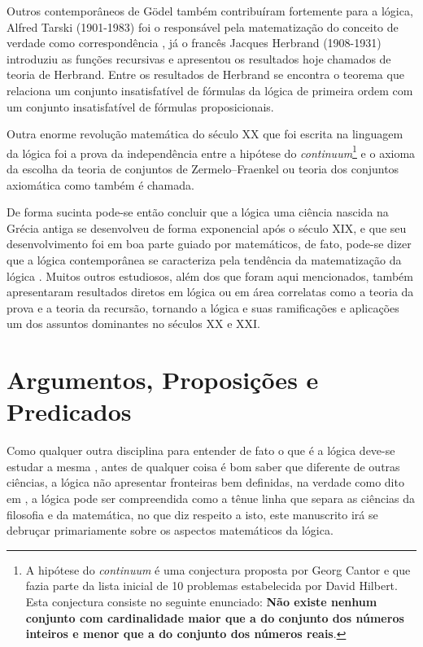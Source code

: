 Outros contemporâneos de Gödel também contribuíram fortemente para a lógica, Alfred Tarski (1901-1983) foi o responsável pela matematização do conceito de verdade como correspondência \cite{abe2002-logica, tarski1983}, já o francês Jacques Herbrand (1908-1931) introduziu as funções recursivas e apresentou os resultados hoje chamados de teoria de Herbrand. Entre os resultados de Herbrand se encontra o teorema que relaciona um conjunto insatisfatível de fórmulas da lógica de primeira ordem com um conjunto insatisfatível de fórmulas proposicionais.

Outra enorme revolução matemática do século XX que foi escrita na linguagem da lógica foi a prova da independência entre a hipótese do \textit{continuum}\footnote{A hipótese do \textit{continuum} é uma conjectura proposta por Georg Cantor e que fazia parte da lista inicial de 10 problemas estabelecida por David Hilbert. Esta conjectura consiste no seguinte enunciado: \textbf{Não existe nenhum conjunto com cardinalidade maior que a do conjunto dos números inteiros e menor que a do conjunto dos números reais}.} e o axioma da escolha da teoria de conjuntos de Zermelo–Fraenkel ou teoria dos conjuntos axiomática como também é chamada.

De forma sucinta pode-se então concluir que a lógica uma ciência nascida na Grécia antiga se desenvolveu de forma exponencial após o século XIX, e que seu desenvolvimento foi em boa parte guiado por matemáticos, de fato, pode-se dizer que a lógica contemporânea se caracteriza pela tendência da matematização da lógica \cite{barreto1998}. Muitos outros estudiosos, além dos que foram aqui mencionados, também apresentaram resultados diretos em lógica ou em área correlatas como a teoria da prova e a teoria da recursão, tornando a lógica e suas ramificações e aplicações um dos assuntos dominantes no séculos XX e XXI. 

\section{Argumentos, Proposições e Predicados}\label{sec:Argumento-Proposicao-Predicado}

Como qualquer outra disciplina para entender de fato o que é a lógica deve-se estudar a mesma \cite{copi1981}, antes de qualquer coisa é bom saber que diferente de outras ciências, a lógica não apresentar fronteiras bem definidas, na verdade como dito em \cite{joaoPavao2014}, a lógica pode ser compreendida como a tênue linha que separa as ciências da filosofia e da matemática, no que diz respeito a isto, este manuscrito irá se debruçar primariamente sobre os aspectos matemáticos da lógica.

